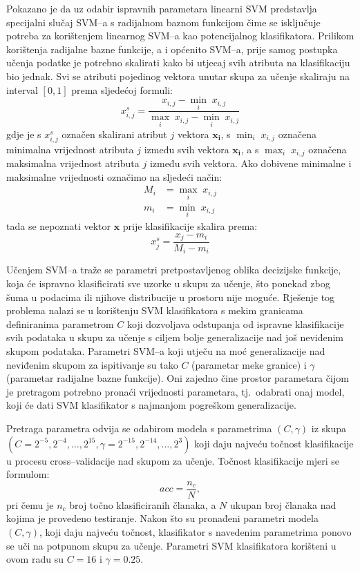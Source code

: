 \documentclass{article}
\begin{document}
Pokazano je da uz odabir ispravnih parametara \citep{keerthi2003asymptotic} linearni SVM
predstavlja specijalni slučaj SVM--a s radijalnom baznom funkcijom čime
se isključuje potreba za korištenjem linearnog SVM--a kao potencijalnog
klasifikatora. Prilikom korištenja radijalne bazne funkcije, a i općenito
SVM--a, prije samog postupka učenja podatke je potrebno skalirati kako bi utjecaj svih
atributa na klasifikaciju bio jednak. Svi se atributi pojedinog vektora unutar
skupa za učenje skaliraju na interval $[0, 1]$ prema sljedećoj formuli:
\begin{equation}
x^{s}_{i,j} = \frac{x_{i,j} - \min_{i}\; x_{i,j}}{\max_{i}\; x_{i,j}
- \min_{i}\; x_{i,j}}
\end{equation}
gdje je s $x^{s}_{i,j}$ označen skalirani atribut $j$ vektora $\mathbf{x_i}$, s
$\min_{i}\; x_{i,j}$ označena minimalna vrijednost atributa $j$ između svih
vektora $\mathbf{x_i}$, a s $\max_{i}\; x_{i,j}$ označena maksimalna vrijednost
atributa $j$ između svih vektora. Ako dobivene minimalne i maksimalne vrijednosti označimo na sljedeći
način:
\begin{eqnarray}
M_i & = \max_{i}\; x_{i,j} \\
m_i & = \min_{i}\; x_{i,j}
\end{eqnarray}
tada se nepoznati vektor $\mathbf{x}$ prije klasifikacije skalira prema:
\begin{equation}
x^{s}_{j} = \frac{x_j-m_i}{M_i-m_i}
\end{equation}

Učenjem SVM--a traže se parametri pretpostavljenog oblika decizijske funkcije,
koja će ispravno klasificirati sve uzorke u skupu za učenje, što ponekad zbog
šuma u podacima ili njihove distribucije u prostoru nije moguće. Rješenje tog
problema nalazi se u korištenju SVM klasifikatora s mekim granicama definiranima
parametrom $C$ koji dozvoljava odstupanja od ispravne klasifikacije svih podataka
u skupu za učenje s ciljem bolje generalizacije nad još neviđenim skupom
podataka. Parametri SVM--a koji utječu na moć generalizacije nad neviđenim skupom
za ispitivanje su tako $C$ (parametar meke granice) i $\gamma$ (parametar
radijalne bazne funkcije). Oni zajedno čine prostor parametara čijom je pretragom
potrebno pronaći vrijednosti parametara, tj.~odabrati onaj model, koji će dati
SVM klasifikator s najmanjom pogreškom generalizacije.

Pretraga parametra odvija se odabirom modela s parametrima $(C, \gamma)$ iz skupa
$\left (C = {2^{-5}, 2^{-4}, \ldots , 2^{15}},  \gamma = {2^{-15}, 2^{-14},
\ldots, 2^3} \right )$ \citep{CC01a} koji daju najveću točnost klasifikacije u
procesu cross--validacije nad skupom za učenje. Točnost klasifikacije mjeri se formulom:
\begin{equation}
acc = \frac{n_c}{N},
\end{equation}
pri čemu je $n_c$ broj točno klasificiranih članaka, a $N$ ukupan broj članaka
nad kojima je provedeno testiranje. Nakon što su pronađeni parametri modela $(C,
\gamma)$, koji daju najveću točnost, klasifikator s navedenim parametrima ponovo
se uči na potpunom skupu za učenje. Parametri SVM klasifikatora korišteni u ovom
radu su $C = 16$ i $\gamma = 0.25$.
\end{document}

